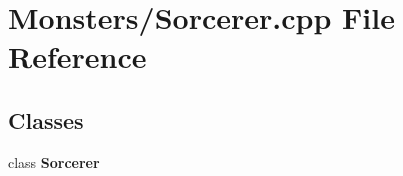 \section{Monsters/\-Sorcerer.cpp File Reference}
\label{_sorcerer_8cpp}
\subsection*{Classes}
\begin{DoxyCompactItemize}
\item 
class {\bf Sorcerer}
\end{DoxyCompactItemize}
